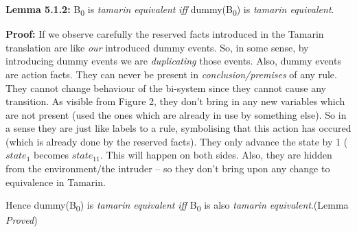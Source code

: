 \documentclass[11pt]{article}
\begin{document}
\vspace{12pt}

{\bf Lemma 5.1.2: }B\textsubscript{0} is {\it tamarin equivalent} {\it iff} dummy(B\textsubscript{0}) is {\it tamarin equivalent}.\newline

{\bf Proof: }If we observe carefully the reserved facts introduced in the Tamarin translation are like {\it our} introduced dummy events. So, in some sense, by introducing dummy events we are {\it duplicating} those events. Also, dummy events are action facts. They can never be present in {\it conclusion/premises} of any rule. They cannot change behaviour of the bi-system since they cannot cause any transition. As visible from Figure 2, they don't bring in any new variables which are not present (used the ones which are already in use by something else). So in a sense they are just like labels to a rule, symbolising that this action has occured (which is already done by the reserved facts). They only advance the state by 1 ($state_1$ becomes $state_11$. This will happen on both sides. Also, they are hidden from the environment/the intruder -- so they don't bring upon any change to equivalence in Tamarin.\newline


Hence dummy(B\textsubscript{0}) is {\it tamarin equivalent} {\it iff} B\textsubscript{0} is also {\it tamarin equivalent}.\hfill \hfill (Lemma {\it Proved})

\vspace{12pt}
\end{document}
